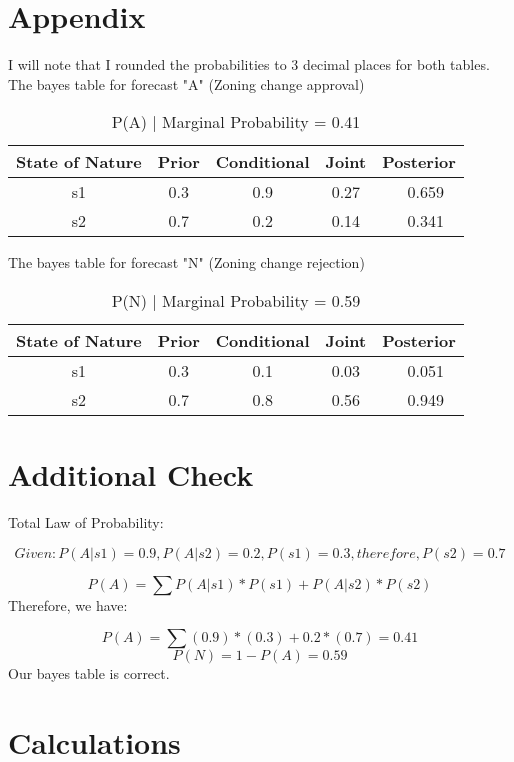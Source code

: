 \documentclass{article}
\begin{document}
	




\section{Appendix}
I will note that I rounded the probabilities to 3 decimal places for both tables. \\
The bayes table for forecast "A" (Zoning change approval)

\begin{table}[h!]
\centering
\begin{tabular}{|c|c|c|c|c|}
\hline
\textbf{State of Nature} & \textbf{Prior} & \textbf{Conditional} & \textbf{Joint} & \textbf{Posterior} \\
\hline
s1 &  0.3 & 0.9  & 0.27 &  ~ 0.659\\
\hline
s2  & 0.7 & 0.2 & 0.14 &  ~ 0.341\\
\hline
\end{tabular}
\caption{P(A) | Marginal Probability = 0.41  }
\end{table}



The bayes table for forecast "N" (Zoning change rejection)
\begin{table}[h!]
\centering
\begin{tabular}{|c|c|c|c|c|}
\hline
\textbf{State of Nature} & \textbf{Prior} & \textbf{Conditional} & \textbf{Joint} & \textbf{Posterior} \\
\hline
s1 &  0.3 & 0.1  & 0.03 &  ~ 0.051\\
\hline
s2  & 0.7 & 0.8 & 0.56 &  ~ 0.949\\
\hline
\end{tabular}
\caption{P(N) | Marginal Probability = 0.59 }
\end{table}

\section*{Additional Check}
Total Law of Probability:

\[
Given:  P(A| s1) = 0.9,
 P(A|s2) = 0.2, P(s1) = 0.3, therefore, P(s2) = 0.7
\]

\[
P(A) =  \sum P(A| s1) * P(s1) + P(A|s2) * P(s2)
\]
Therefore, we have:

\[
P(A) = \sum(0.9) * (0.3) + 0.2 * (0.7) = 0.41 
\]
\[
P(N) = 1 - P(A) = 0.59
\]
Our bayes table is correct.


\section*{Calculations}
\end{document}
